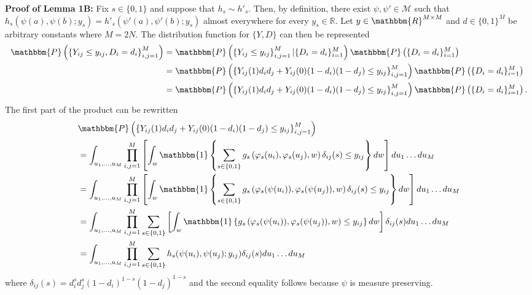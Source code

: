 \documentclass[12pt]{article}
\theoremstyle{definition}
\begin{document}
\begin{flushleft}
\textbf{Proof of Lemma 1B:} 
Fix $s \in \{0,1\}$ and suppose that $h_{s} \sim h'_{s}$. Then, by definition, there exist $\psi,\psi' \in \mathcal{M}$ such that $h_{s}(\psi(a),\psi(b);y_s) = h'_{s}(\psi'(a),\psi'(b);y_s)$ almost everywhere for every $y_s \in \mathbb{R}$. Let $y \in \mathbbm{R}^{M\times M}$ and $d \in \{0,1\}^{M}$ be arbitrary constants where $M = 2N$. The distribution function for $\{Y,D\}$ can then be represented 
\begin{align*}
\mathbbm{P}\left(\left\{Y_{ij} \leq y_{ij}, D_{i} = d_i\right\}_{i,j=1}^{M}\right) 
&= \mathbbm{P}\left(\left\{Y_{ij} \leq y_{ij}\right\}_{i,j=1}^{M}|\{D_i = d_i\}_{i=1}^{M}\right)\mathbbm{P}\left(\{D_i = d_i\}_{i=1}^{M}\right)  \\
&= \mathbbm{P}\left(\left\{Y_{ij}(1)d_i d_j + Y_{ij}(0)(1-d_i)(1-d_j) \leq y_{ij}\right\}_{i,j=1}^{M}\right)\mathbbm{P}\left(\{D_i = d_i\}_{i=1}^{M}\right) \\
&= \mathbbm{P}\left(\left\{Y_{ij}(1)d_i d_j + Y_{ij}(0)(1-d_i)(1-d_j) \leq y_{ij}\right\}_{i,j=1}^{M}\right)\mathbbm{P}\left(\{D_i = d_i\}_{i=1}^{M}\right).
\end{align*}
The first part of the product can be rewritten
\begin{align*}
&\mathbbm{P}\left(\left\{Y_{ij}(1)d_i d_j + Y_{ij}(0)(1-d_i)(1-d_j) \leq y_{ij}\right\}_{i,j=1}^{M}\right) \\
&= \int_{u_1,\ldots,u_{M}}\prod_{i,j=1}^{M}\left[ \int_w\mathbbm{1}\left\{  \sum_{s \in \{0,1\}}g_{s}\left(\varphi_s(u_i),\varphi_s(u_j),w\right)\delta_{ij}(s) \leq y_{ij}\right\}dw\right]du_1\ldots du_{M} \\
&= \int_{u_1,\ldots,u_{M}}\prod_{i,j=1}^{M}\left[ \int_w\mathbbm{1}\left\{  \sum_{s \in \{0,1\}}g_{s}\left(\varphi_s(\psi(u_i)),\varphi_s(\psi(u_j)),w\right)\delta_{ij}(s)  \leq y_{ij}\right\}dw\right]du_1\ldots du_{M} \\ 
&= \int_{u_1,\ldots,u_{M}}\prod_{i,j=1}^{M} \sum_{s \in \{0,1\}}\left[ \int_w\mathbbm{1}\left\{ g_{s}\left(\varphi_s(\psi(u_i)),\varphi_s(\psi(u_j)),w\right)\leq y_{ij}\right\}dw\right]\delta_{ij}(s)  du_1\ldots du_{M} \\
&= \int_{u_1,\ldots,u_{M}}\prod_{i,j=1}^{M} \sum_{s \in \{0,1\}}h_{s}(\psi(u_i),\psi(u_j); y_{ij})\delta_{ij}(s) du_1\ldots du_{M} 
\end{align*}
where $\delta_{ij}(s) = d_i^sd_j^s(1-d_i)^{1-s}(1-d_j)^{1-s}$ and the second equality follows because $\psi$ is measure preserving. \newline


\end{flushleft}
\end{document}
